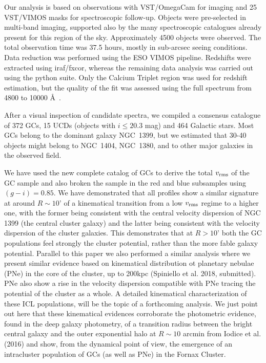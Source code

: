 \documentclass[useAMS,usenatbib]{mn2e}
\begin{document}
Our analysis is based on observations with VST/OmegaCam for imaging and 25 
VST/VIMOS masks for spectroscopic follow-up. Objects were pre-selected in 
multi-band imaging, supported also by the many spectroscopic catalogues already 
present for this region of the sky.  Approximately 4500 objects were observed. 
The total observation time was 37.5 hours, mostly in sub-arcsec seeing 
conditions. Data reduction was performed using the ESO VIMOS pipeline. 
Redshifts were extracted using iraf/fxcor, whereas the remaining data analysis 
was carried out using the python suite. Only the Calcium Triplet region was 
used for redshift estimation, but the quality of the fit was assessed using the 
full spectrum from 4800 to 10000 \AA\ .

After a visual inspection of candidate spectra, we compiled a consensus 
catalogue of 372 GCs, 15 UCDs (objects with $i \le 20.3$ mag) and 464 Galactic 
stars. Most GCs belong to the dominant galaxy NGC~1399, but we estimated that 
30-40 objects might belong to NGC~1404, NGC~1380, and to other major galaxies 
in the observed field.

We have used the new complete catalog of GCs to derive the total  $v_{\rm rms}$ 
of the GC sample and also broken the sample in the red and blue subsamples using
$(g - i) = 0.85$.
We have demonstrated that all profiles show a similar signature at around 
$R\sim10’$ of a kinematical transition from a low $v_{\rm rms}$ regime to a 
higher one, with the former being consistent with the central velocity 
dispersion of NGC 1399 (the central cluster galaxy) and the latter being 
consistent with the velocity dispersion of the cluster galaxies. This 
demonstrates that at $R>10’$ both the GC populations feel strongly the cluster 
potential, rather than the more fable galaxy potential. Parallel to this paper 
we also performed a similar analysis where we present similar evidence based on 
kinematical distribution ot planetary nebulae (PNe) in the core of the cluster, 
up to 200kpc (Spiniello et al. 2018, submitted). PNe also show a rise in the 
velocity dispersion compatible with PNe tracing the potential of the cluster as 
a whole. A detailed kinematical characterization of these ICL populations, will 
be the topic of a forthcoming analysis. We just point out here that these 
kinematical evidences corroborate the photometric evidence, found in the deep 
galaxy photometry, of a transition radius between the bright central galaxy and 
the outer exponential halo at $R\sim10$ arcmin from Iodice et al. (2016) and 
show, from the dynamical point of view, the emergence of an intracluster 
population of GCs (as well as PNe) in the Fornax Cluster.




\end{document}
